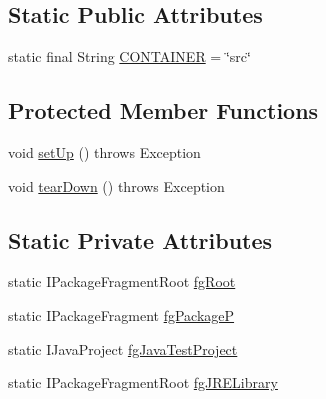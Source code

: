 \subsection*{Static Public Attributes}
\begin{DoxyCompactItemize}
\item 
static final String \hyperlink{classorg_1_1eclipse_1_1jdt_1_1ui_1_1tests_1_1refactoring_1_1infra_1_1RefactoringTestSetup_ade13ca1a53557e54e9aa9108b671982a}{CONTAINER} = \char`\"{}src\char`\"{}
\end{DoxyCompactItemize}
\subsection*{Protected Member Functions}
\begin{DoxyCompactItemize}
\item 
void \hyperlink{classorg_1_1eclipse_1_1jdt_1_1ui_1_1tests_1_1refactoring_1_1infra_1_1RefactoringTestSetup_a2bed72295e6972ba6bae8385c6815580}{setUp} ()  throws Exception 
\item 
void \hyperlink{classorg_1_1eclipse_1_1jdt_1_1ui_1_1tests_1_1refactoring_1_1infra_1_1RefactoringTestSetup_a6d6dd64f8b23fd51e3e18ab2b01b9556}{tearDown} ()  throws Exception 
\end{DoxyCompactItemize}
\subsection*{Static Private Attributes}
\begin{DoxyCompactItemize}
\item 
static IPackageFragmentRoot \hyperlink{classorg_1_1eclipse_1_1jdt_1_1ui_1_1tests_1_1refactoring_1_1infra_1_1RefactoringTestSetup_a975714f4eccc9bd2a51353ef9ecab496}{fgRoot}
\item 
static IPackageFragment \hyperlink{classorg_1_1eclipse_1_1jdt_1_1ui_1_1tests_1_1refactoring_1_1infra_1_1RefactoringTestSetup_aa895cf3ff04e3cfa6dd633a28f2d48c9}{fgPackageP}
\item 
static IJavaProject \hyperlink{classorg_1_1eclipse_1_1jdt_1_1ui_1_1tests_1_1refactoring_1_1infra_1_1RefactoringTestSetup_ae1e850e75f49931a9f649b1c0e852d9f}{fgJavaTestProject}
\item 
static IPackageFragmentRoot \hyperlink{classorg_1_1eclipse_1_1jdt_1_1ui_1_1tests_1_1refactoring_1_1infra_1_1RefactoringTestSetup_a201559d9722608a3fabbf28f27df6034}{fgJRELibrary}
\end{DoxyCompactItemize}


